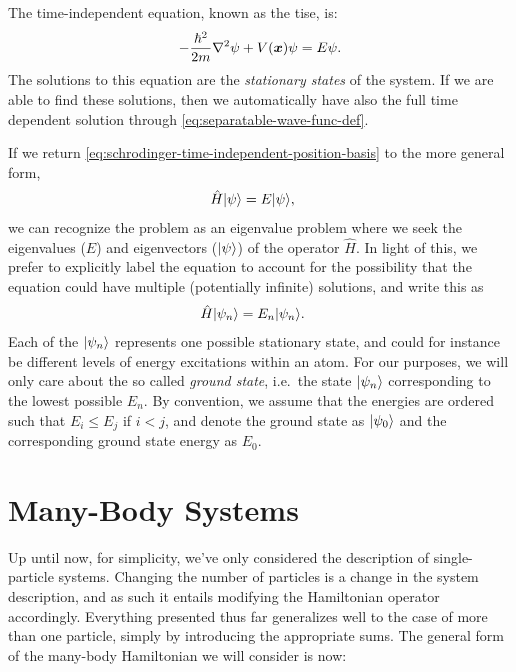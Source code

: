 \documentclass[Thesis.tex]{subfiles}
\begin{document}
The time-independent equation, known as the \gls{tise}, is:
\begin{align}
    - \frac{\hbar^2}{2m} \laplacian\psi + V(\vb x)\psi =
    E\psi.\label{eq:schrodinger-time-independent-position-basis}
\end{align}
The solutions to this equation are the \emph{stationary states} of the system. If
we are able to find these solutions, then we automatically have also the full time
dependent solution through \cref{eq:separatable-wave-func-def}.

If we return \cref{eq:schrodinger-time-independent-position-basis} to the more general
form,
\begin{align}
    \hat H | \psi \rangle &= E| \psi \rangle,
\end{align}
we can recognize the problem as an eigenvalue problem where we seek the eigenvalues ($E$)
and eigenvectors ($| \psi \rangle$) of the operator $\hat H$. In light of this, we prefer to
explicitly label the equation to account for the possibility that the equation could have
multiple (potentially infinite) solutions, and write this as
\begin{align}
    \hat H| \psi_n \rangle &= E_n| \psi_n \rangle.
\end{align}
Each of the $| \psi_n \rangle$ represents one possible stationary state, and could for instance be
different levels of energy excitations within an atom. For our purposes, we will only care
about the so called \emph{ground state}, i.e.\ the state $| \psi_n \rangle$ corresponding to the
lowest possible $E_n$. By convention, we assume that the energies are ordered such that $E_i
\leq E_j$ if $i < j$, and denote the ground state as $| \psi_0 \rangle$ and the corresponding ground
state energy as $E_0$.


\section{Many-Body Systems}

Up until now, for simplicity, we've only considered the description of single-particle
systems. Changing the number of particles is a change in the system description, and as
such it entails modifying the Hamiltonian operator accordingly. Everything presented thus
far generalizes well to the case of more than one particle, simply by introducing the
appropriate sums. The general form of the many-body Hamiltonian we will consider is now:
\end{document}
